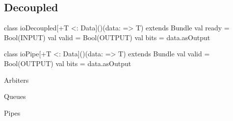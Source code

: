 \documentclass[10pt,twocolumn]{article}
\begin{document}
\subsection{Decoupled}

\begin{scala}
class ioDecoupled[+T <: Data]()(data: => T) 
    extends Bundle {
  val ready = Bool(INPUT)
  val valid = Bool(OUTPUT)
  val bits  = data.asOutput
}

class ioPipe[+T <: Data]()(data: => T) 
    extends Bundle {
  val valid = Bool(OUTPUT)
  val bits = data.asOutput
}

Arbiters

Queues

Pipes
\end{scala}

\end{document}

